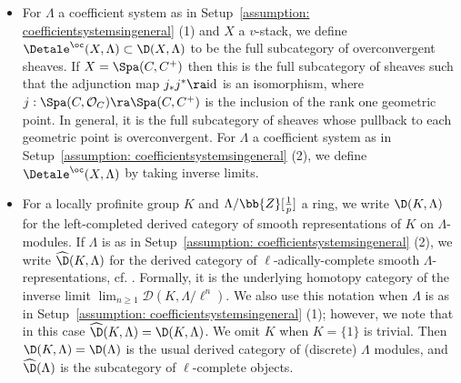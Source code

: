 \documentclass[letterpaper,11pt]{amsart}
\begin{document}
\begin{itemize}
For our ultimate results, we will use the following setup.  
\begin{setup}{\label{assumption: coefficients}}
We assume that $\Lambda/\mathbb{Z}_{\ell}$ is of the following form: 
\begin{enumerate}
\item $\Lambda$ is a finite ring that is self-injective and $\ell$-power torsion.
\item $\Lambda = \mathcal{O}_{F}$ for $F/\bb{Q}_{\ell}$ a finite extension.
\item $\Lambda = F$ for $F/\bb{Q}_{\ell}$ a finite extension. 
\item $\Lambda = \mathcal{O}_{F},F$ for $F/\bb{Q}_{\ell}$ a (possibly infinite) algebraic extension.
\item $\Lambda$ is a (possibly infinite) algebraic extension of $\bb{F}_{\ell}$.
\end{enumerate}
\end{setup}

\noindent Self-injectivity in case (1) will allow us to define a perverse sheaf theory that behaves well with respect to Verdier duality.

\item For $\Lambda$ a coefficient system as in Setup~\ref{assumption: coefficientsystemsingeneral} (1) and $X$ a $v$-stack, we define $\Detale^{\oc}(X,\Lambda) \subset \D(X,\Lambda)$ to be the full subcategory of overconvergent sheaves. If $X = \Spa(C,C^{+})$ then this is the full subcategory of sheaves such that the adjunction map $j_{*}j^{*} \ra \mathrm{id}$ is an isomorphism, where $j: \Spa(C,\mathcal{O}_{C}) \ra \Spa(C,C^{+})$ is the inclusion of the rank one geometric point. In general, it is the full subcategory of sheaves whose pullback to each geometric point is overconvergent. For $\Lambda$ a coefficient system as in Setup~\ref{assumption: coefficientsystemsingeneral} (2), we define $\Detale^{\oc}(X,\Lambda)$ by taking inverse limits.
\item For a locally profinite group $K$ and $\Lambda/\bb{Z}[\frac{1}{p}]$ a ring, we write $\D(K,\Lambda)$ for the left-completed derived category of smooth representations of $K$ on $\Lambda$-modules. If $\Lambda$ is as in Setup~\ref{assumption: coefficientsystemsingeneral} (2), we write $\widehat{\D}(K,\Lambda)$ for the derived category of $\ell$-adically-complete smooth $\Lambda$-representations, cf. \cite[Section~2.2]{HansenSupercuspidalCohomology}. Formally, it is the underlying homotopy category of the inverse limit $\lim_{n \geq 1} \mathcal{D}(K,\Lambda/\ell^{n})$. We also use this notation when $\Lambda$ is as in Setup~\ref{assumption: coefficientsystemsingeneral} (1); however, we note that in this case $\widehat{\D}(K,\Lambda) = \D(K,\Lambda)$. We omit $K$ when $K=\{1\}$ is trivial. Then $\D(K,\Lambda)=\D(\Lambda)$ is the usual derived category of (discrete) $\Lambda$ modules, and $\widehat{\D}(\Lambda)$ is the subcategory of $\ell$-complete objects.
\end{itemize}
\end{document}

